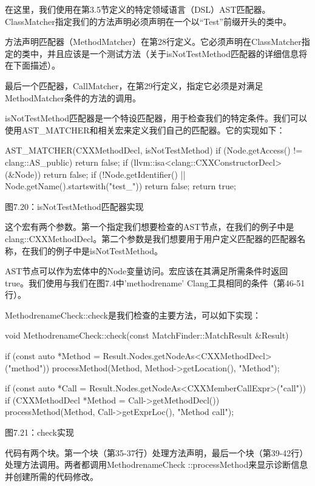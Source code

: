 在这里，我们使用在第3.5节定义的特定领域语言（DSL）AST匹配器。ClassMatcher指定我们的方法声明必须声明在一个以“Test”前缀开头的类中。

方法声明匹配器（MethodMatcher）在第28行定义。它必须声明在ClassMatcher指定的类中，并且应该是一个测试方法（关于isNotTestMethod匹配器的详细信息将在下面描述）。

最后一个匹配器，CallMatcher，在第29行定义，指定它必须是对满足MethodMatcher条件的方法的调用。

isNotTestMethod匹配器是一个特设匹配器，用于检查我们的特定条件。我们可以使用AST\_MATCHER和相关宏来定义我们自己的匹配器。它的实现如下：

\begin{cpp}
AST_MATCHER(CXXMethodDecl, isNotTestMethod) {
  if (Node.getAccess() != clang::AS_public) return false;
  if (llvm::isa<clang::CXXConstructorDecl>(&Node)) return false;
  if (!Node.getIdentifier() || Node.getName().startswith("test_")) return false;
  return true;
}
\end{cpp}

\begin{center}
图7.20：isNotTestMethod匹配器实现
\end{center}

这个宏有两个参数。第一个指定我们想要检查的AST节点，在我们的例子中是clang::CXXMethodDecl。第二个参数是我们想要用于用户定义匹配器的匹配器名称，在我们的例子中是isNotTestMethod。

AST节点可以作为宏体中的Node变量访问。宏应该在其满足所需条件时返回true。我们使用与我们在图7.4中'methodrename' Clang工具相同的条件（第46-51行）。

MethodrenameCheck::check是我们检查的主要方法，可以如下实现：



\begin{cpp}
void MethodrenameCheck::check(const MatchFinder::MatchResult &Result) {
  if (const auto *Method = Result.Nodes.getNodeAs<CXXMethodDecl>("method")) {
    processMethod(Method, Method->getLocation(), "Method");
  }

  if (const auto *Call = Result.Nodes.getNodeAs<CXXMemberCallExpr>("call")) {
    if (CXXMethodDecl *Method = Call->getMethodDecl()) {
      processMethod(Method, Call->getExprLoc(), "Method call");
    }
  }
}
\end{cpp}

\begin{center}
图7.21：check实现
\end{center}

代码有两个块。第一个块（第35-37行）处理方法声明，最后一个块（第39-42行）处理方法调用。两者都调用MethodrenameCheck ::processMethod来显示诊断信息并创建所需的代码修改。

